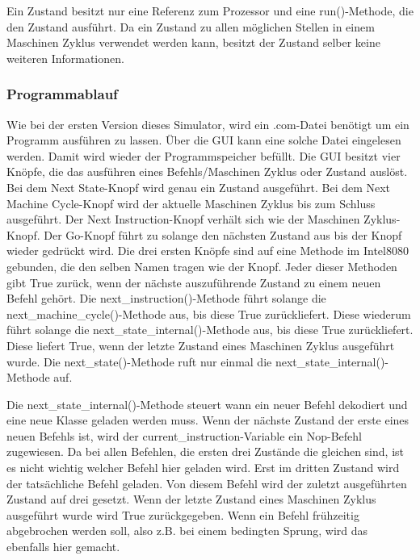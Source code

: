 \documentclass[12pt]{article}
\begin{document}
\noindent
Ein Zustand besitzt nur eine Referenz zum Prozessor und eine run()-Methode, die den Zustand ausführt. Da ein Zustand zu allen möglichen Stellen in einem Maschinen Zyklus verwendet werden kann, besitzt der Zustand selber keine weiteren Informationen.


\subsubsection{Programmablauf}

Wie bei der ersten Version dieses Simulator, wird ein .com-Datei benötigt um ein Programm ausführen zu lassen. Über die GUI kann eine solche Datei eingelesen werden. Damit wird wieder der Programmspeicher befüllt.
Die GUI besitzt vier Knöpfe, die das ausführen eines Befehls/Maschinen Zyklus oder Zustand auslöst. Bei dem \glqq Next State\grqq -Knopf wird genau ein Zustand ausgeführt. Bei dem \glqq Next Machine Cycle\grqq -Knopf wird der aktuelle Maschinen Zyklus bis zum Schluss ausgeführt. Der  \glqq Next Instruction\grqq -Knopf verhält sich wie der Maschinen Zyklus-Knopf. Der \glqq Go\grqq -Knopf führt zu solange den nächsten Zustand aus bis der Knopf wieder gedrückt wird. Die drei ersten Knöpfe sind auf eine Methode im Intel8080 gebunden, die den selben Namen tragen wie der Knopf. Jeder dieser Methoden gibt True zurück, wenn der nächste auszuführende Zustand zu einem neuen Befehl gehört. 
Die next\_instruction()-Methode führt solange die next\_machine\_cycle()-Methode aus, bis diese True zurückliefert. Diese wiederum führt solange die next\_state\_internal()-Methode aus, bis diese True zurückliefert. Diese liefert True, wenn der letzte Zustand eines Maschinen Zyklus ausgeführt wurde. Die next\_state()-Methode ruft nur einmal die next\_state\_internal()-Methode auf.

\noindent
Die next\_state\_internal()-Methode steuert wann ein neuer Befehl dekodiert und eine neue Klasse geladen werden muss. Wenn der nächste Zustand der erste eines neuen Befehls ist, wird der current\_instruction-Variable ein Nop-Befehl zugewiesen. Da bei allen Befehlen, die ersten drei Zustände die gleichen sind, ist es nicht wichtig welcher Befehl hier geladen wird. Erst im dritten Zustand wird der tatsächliche Befehl geladen. Von diesem Befehl wird der zuletzt ausgeführten Zustand auf drei gesetzt. Wenn der letzte Zustand eines Maschinen Zyklus ausgeführt wurde wird True zurückgegeben. Wenn ein Befehl frühzeitig abgebrochen werden soll, also z.B. bei einem bedingten Sprung, wird das ebenfalls hier gemacht.
\end{document}
